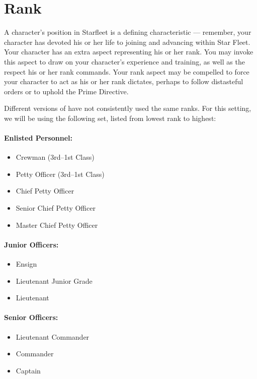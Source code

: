 \documentclass[12pt,titlepage,openany]{book}
\begin{document}
\section{Rank}\label{sec:rank}

A character's position in Starfleet is a defining characteristic --- remember,
your character has devoted his or her life to joining and advancing within Star
Fleet. Your character has an extra aspect representing his or her rank. You may
invoke this aspect to draw on your character's experience and training, as well
as the respect his or her rank commands. Your rank aspect may be compelled to
force your character to act as his or her rank dictates, perhaps to follow
distasteful orders or to uphold the Prime Directive.


Different versions of \StarTrek{} have not consistently used the same ranks.
For this setting, we will be using the following set, listed from lowest rank
to highest:

\begin{multicols}{2}
    \raggedcolumns
    \paragraph{Enlisted Personnel:}
    \begin{itemize}
        \item Crewman (3rd--1st Class)
        \item Petty Officer (3rd--1st Class)
        \item Chief Petty Officer
        \item Senior Chief Petty Officer
        \item Master Chief Petty Officer
    \end{itemize}

    \columnbreak
    \paragraph{Junior Officers:}
    \begin{itemize}
        \item Ensign
        \item Lieutenant Junior Grade
        \item Lieutenant
    \end{itemize}

    \paragraph{Senior Officers:}
    \begin{itemize}
        \item Lieutenant Commander
        \item Commander
        \item Captain
    \end{itemize}
\end{multicols}
\end{document}
